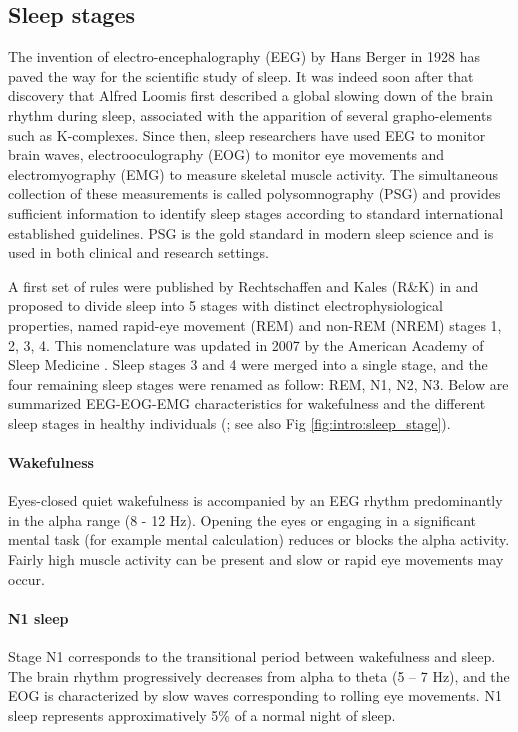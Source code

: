 \subsection{Sleep stages}
\label{sec:dream-research:sleep:stages}

The invention of electro-encephalography (EEG) by Hans Berger in 1928 has paved the way for the scientific study of sleep. It was indeed soon after that discovery that Alfred Loomis first described a global slowing down of the brain rhythm during sleep, associated with the apparition of several grapho-elements such as K-complexes. Since then, sleep researchers have used EEG to monitor brain waves, electrooculography (EOG) to monitor eye movements and electromyography (EMG) to measure skeletal muscle activity. The simultaneous collection of these measurements is called polysomnography (PSG) and provides sufficient information to identify sleep stages according to standard international established guidelines. PSG is the gold standard in modern sleep science and is used in both clinical and research settings.

A first set of rules were published by Rechtschaffen and Kales (R\&K) in \citeyear{kales_manual_1968} and proposed to divide sleep into 5 stages with distinct electrophysiological properties, named rapid-eye movement (REM) and non-REM (NREM) stages 1, 2, 3, 4. This nomenclature was updated in 2007 by the American Academy of Sleep Medicine \citep{iber_aasm_2007}. Sleep stages 3 and 4 were merged into a single stage, and the four remaining sleep stages were renamed as follow: REM, N1, N2, N3. Below are summarized EEG-EOG-EMG characteristics for wakefulness and the different sleep stages in healthy individuals  (\citealp{hirshkowitz_normal_2004, iber_aasm_2007}; see also Fig \ref{fig:intro:sleep_stage}).

\paragraph{Wakefulness}
Eyes-closed quiet wakefulness is accompanied by an EEG rhythm predominantly in the alpha range (8 - 12 Hz). Opening the eyes or engaging in a significant mental task (for example mental calculation) reduces or blocks the alpha activity. Fairly high muscle activity can be present and slow or rapid eye movements may occur.

\paragraph{N1 sleep}
Stage N1 corresponds to the transitional period between wakefulness and sleep. The brain rhythm progressively decreases from alpha to theta (5 – 7 Hz), and the EOG is characterized by slow waves corresponding to rolling eye movements. N1 sleep represents approximatively 5\% of a normal night of sleep.


